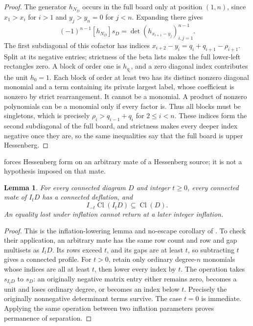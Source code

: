 \documentclass[11pt,a4paper]{amsart}
\numberwithin{equation}{section}
\theoremstyle{plain}
\newtheorem{lemma}[theorem]{Lemma}
\theoremstyle{definition}
\begin{document}
\begin{proof}
The generator \(h_{N_D}\) occurs in the full board only at position
\((1,n)\), since \(x_1>x_i\) for \(i>1\) and \(y_j>y_n=0\) for
\(j<n\).  Expanding there gives
\[
 (-1)^{n-1}[h_{N_D}]s_D=\det(h_{x_{i+1}-y_j})_{i,j=1}^{n-1}.
\]
The first subdiagonal of this cofactor has indices
\(x_{i+2}-y_i=q_i+q_{i+1}-\rho_{i+1}\).  Split at its negative
entries; strictness of the beta lists makes the full lower-left
rectangles zero.  A block of order one is \(h_{q_i}\), and a zero
diagonal index contributes the unit \(h_0=1\).  Each block of order at
least two has its distinct nonzero diagonal monomial and a term
containing its private largest label, whose coefficient is nonzero by
strict rearrangement.  It cannot be a monomial.  A product of nonzero
polynomials can be a monomial only if every factor is.  Thus all blocks
must be singletons, which is precisely \(\rho_i>q_{i-1}+q_i\) for
\(2\le i<n\).  These indices form the second subdiagonal of the full
board, and strictness makes every deeper index negative once they are,
so the same inequalities say that the full board is upper Hessenberg.
\end{proof}

 forces Hessenberg form on an arbitrary
mate of a Hessenberg source; it is not a hypothesis imposed on that mate.

\begin{lemma}\label{lem:lowering}
For every connected diagram \(D\) and integer \(t\ge0\), every
connected mate of \(I_tD\) has a connected deflation, and
\[
 I_{-t}\operatorname{Cl}(I_tD)\subseteq\operatorname{Cl}(D).
\]
An equality lost under inflation cannot return at a later integer
inflation.
\end{lemma}

\begin{proof}
This is the inflation-lowering lemma and no-escape corollary of
\cite{Shields2026Inflation}.  To check their application, an arbitrary
mate has the same row count and row and gap multisets as \(I_tD\).
Its rows exceed \(t\), and its gaps are at least \(t\), so
subtracting \(t\) gives a connected profile.  For \(t>0\), retain
only ordinary degree-\(n\) monomials whose indices are all at least
\(t\), then lower every index by \(t\).  The operation takes
\(s_{I_tD}\) to \(s_D\): an originally negative matrix entry
either remains zero, becomes a unit and loses ordinary degree, or becomes
an index below \(t\).  Precisely the originally nonnegative determinant
terms survive.  The case \(t=0\) is immediate.  Applying the same
operation between two inflation parameters proves permanence of
separation.
\end{proof}
\end{document}
